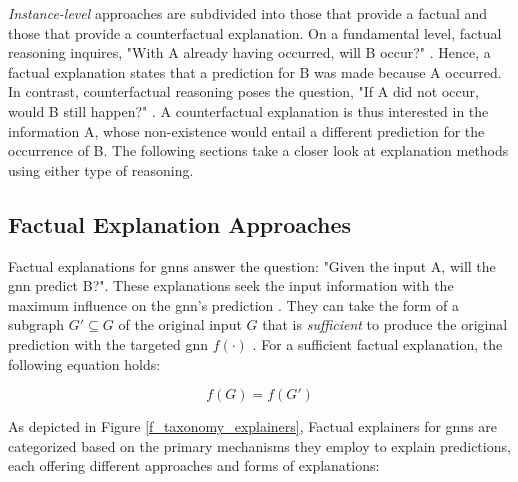 \textit{Instance-level} approaches are subdivided into those that provide a factual and those that provide a counterfactual explanation. On a fundamental level, factual reasoning inquires, "With A already having occurred, will B occur?" \cite{quelhas_relation_2018, tan_learning_2022}. Hence, a factual explanation states that a prediction for B was made because A occurred. In contrast, counterfactual reasoning poses the question, "If A did not occur, would B still happen?" \cite{quelhas_relation_2018, tan_learning_2022}. A counterfactual explanation is thus interested in the information A, whose non-existence would entail a different prediction for the occurrence of B. The following sections take a closer look at explanation methods using either type of reasoning.

\subsection{Factual Explanation Approaches}
\label{s_ExplainingGNNs_Factual}

Factual explanations for \glspl{gnn} answer the question: "Given the input A, will the \gls{gnn} predict B?". These explanations seek the input information with the maximum influence on the \gls{gnn}'s prediction \cite{kakkad_survey_2023}. They can take the form of a subgraph $G' \subseteq G$ of the original input $G$ \cite{kakkad_survey_2023} that is \textit{sufficient} to produce the original prediction with the targeted \gls{gnn} $f(\cdot)$ \cite{tan_learning_2022}. For a sufficient factual explanation, the following equation holds:

\begin{equation}
    f(G) = f(G')
\end{equation}

\vspace{0.5cm}

As depicted in Figure \ref{f_taxonomy_explainers}, Factual explainers for \glspl{gnn} are categorized based on the primary mechanisms they employ to explain predictions, each offering different approaches and forms of explanations:

